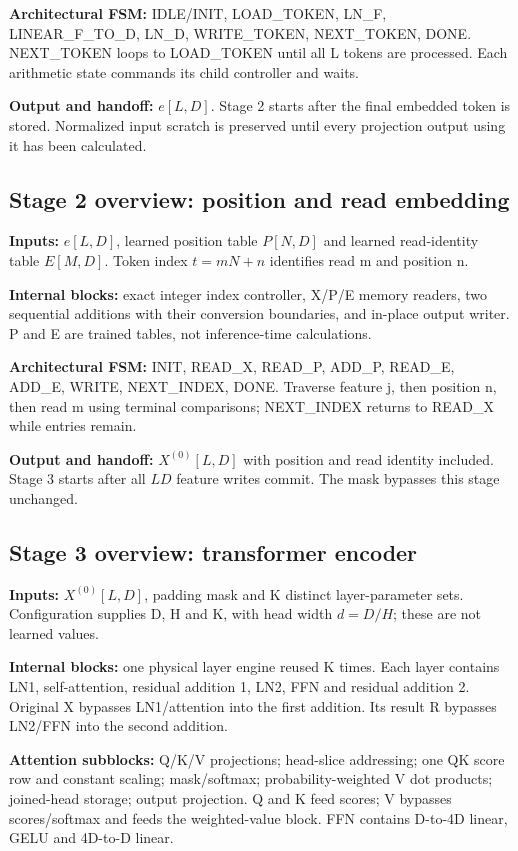 \textbf{Architectural FSM:} IDLE/INIT, LOAD\_TOKEN, LN\_F, LINEAR\_F\_TO\_D, LN\_D, WRITE\_TOKEN, NEXT\_TOKEN, DONE. NEXT\_TOKEN loops to LOAD\_TOKEN until all L tokens are processed. Each arithmetic state commands its child controller and waits.

\textbf{Output and handoff:} $e[L,D]$. Stage 2 starts after the final embedded token is stored. Normalized input scratch is preserved until every projection output using it has been calculated.

\subsection{Stage 2 overview: position and read embedding}
\textbf{Inputs:} $e[L,D]$, learned position table $P[N,D]$ and learned read-identity table $E[M,D]$. Token index $t=mN+n$ identifies read m and position n.

\textbf{Internal blocks:} exact integer index controller, X/P/E memory readers, two sequential additions with their conversion boundaries, and in-place output writer. P and E are trained tables, not inference-time calculations.

\textbf{Architectural FSM:} INIT, READ\_X, READ\_P, ADD\_P, READ\_E, ADD\_E, WRITE, NEXT\_INDEX, DONE. Traverse feature j, then position n, then read m using terminal comparisons; NEXT\_INDEX returns to READ\_X while entries remain.

\textbf{Output and handoff:} $X^{(0)}[L,D]$ with position and read identity included. Stage 3 starts after all $LD$ feature writes commit. The mask bypasses this stage unchanged.

\subsection{Stage 3 overview: transformer encoder}
\textbf{Inputs:} $X^{(0)}[L,D]$, padding mask and K distinct layer-parameter sets. Configuration supplies D, H and K, with head width $d=D/H$; these are not learned values.

\textbf{Internal blocks:} one physical layer engine reused K times. Each layer contains LN1, self-attention, residual addition 1, LN2, FFN and residual addition 2. Original X bypasses LN1/attention into the first addition. Its result R bypasses LN2/FFN into the second addition.

\textbf{Attention subblocks:} Q/K/V projections; head-slice addressing; one QK score row and constant scaling; mask/softmax; probability-weighted V dot products; joined-head storage; output projection. Q and K feed scores; V bypasses scores/softmax and feeds the weighted-value block. FFN contains D-to-4D linear, GELU and 4D-to-D linear.

